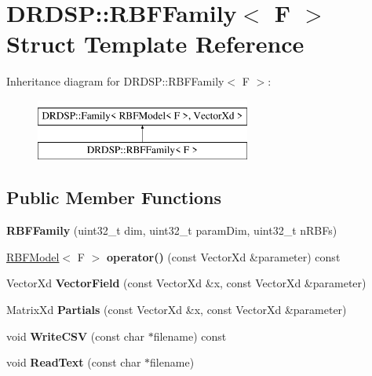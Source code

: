 \hypertarget{struct_d_r_d_s_p_1_1_r_b_f_family}{\section{D\-R\-D\-S\-P\-:\-:R\-B\-F\-Family$<$ F $>$ Struct Template Reference}
\label{struct_d_r_d_s_p_1_1_r_b_f_family}
}
Inheritance diagram for D\-R\-D\-S\-P\-:\-:R\-B\-F\-Family$<$ F $>$\-:\begin{figure}[H]
\begin{center}
\leavevmode
\includegraphics[height=2.000000cm]{struct_d_r_d_s_p_1_1_r_b_f_family}
\end{center}
\end{figure}
\subsection*{Public Member Functions}
\begin{DoxyCompactItemize}
\item 
\hypertarget{struct_d_r_d_s_p_1_1_r_b_f_family_aa74d19e809c115443201acfc23dffcfd}{{\bfseries R\-B\-F\-Family} (uint32\-\_\-t dim, uint32\-\_\-t param\-Dim, uint32\-\_\-t n\-R\-B\-Fs)}\label{struct_d_r_d_s_p_1_1_r_b_f_family_aa74d19e809c115443201acfc23dffcfd}

\item 
\hypertarget{struct_d_r_d_s_p_1_1_r_b_f_family_a910e425f87aec3f906d8ea69e1184317}{\hyperlink{struct_d_r_d_s_p_1_1_r_b_f_model}{R\-B\-F\-Model}$<$ F $>$ {\bfseries operator()} (const Vector\-Xd \&parameter) const }\label{struct_d_r_d_s_p_1_1_r_b_f_family_a910e425f87aec3f906d8ea69e1184317}

\item 
\hypertarget{struct_d_r_d_s_p_1_1_r_b_f_family_a627bffdebc3fe07744c8356d2a0d7b77}{Vector\-Xd {\bfseries Vector\-Field} (const Vector\-Xd \&x, const Vector\-Xd \&parameter)}\label{struct_d_r_d_s_p_1_1_r_b_f_family_a627bffdebc3fe07744c8356d2a0d7b77}

\item 
\hypertarget{struct_d_r_d_s_p_1_1_r_b_f_family_a0f1ab2caec6cfd205773aed2346856ed}{Matrix\-Xd {\bfseries Partials} (const Vector\-Xd \&x, const Vector\-Xd \&parameter)}\label{struct_d_r_d_s_p_1_1_r_b_f_family_a0f1ab2caec6cfd205773aed2346856ed}

\item 
\hypertarget{struct_d_r_d_s_p_1_1_r_b_f_family_a736037a90475af4e332675be367e14c8}{void {\bfseries Write\-C\-S\-V} (const char $\ast$filename) const }\label{struct_d_r_d_s_p_1_1_r_b_f_family_a736037a90475af4e332675be367e14c8}

\item 
\hypertarget{struct_d_r_d_s_p_1_1_r_b_f_family_aac8af8a4b41acb5c51d43ec9500df5c7}{void {\bfseries Read\-Text} (const char $\ast$filename)}\label{struct_d_r_d_s_p_1_1_r_b_f_family_aac8af8a4b41acb5c51d43ec9500df5c7}

\end{DoxyCompactItemize}
